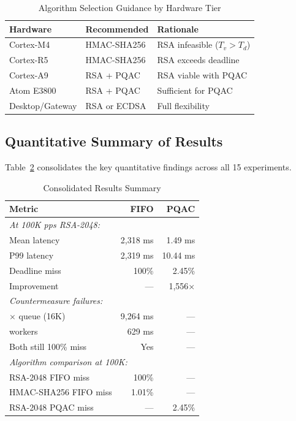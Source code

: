 \documentclass{ieeeaccess}
\begin{document}
\begin{table}[t]
\caption{Algorithm Selection Guidance by Hardware Tier}
\label{tab:algo_guidance}
\centering
\small
\begin{tabular}{lll}
\toprule
\textbf{Hardware} & \textbf{Recommended} & \textbf{Rationale} \\
\midrule
Cortex-M4 & HMAC-SHA256 & RSA infeasible ($T_v > T_d$) \\
Cortex-R5 & HMAC-SHA256 & RSA exceeds deadline \\
Cortex-A9 & RSA + PQAC & RSA viable with PQAC \\
Atom E3800 & RSA + PQAC & Sufficient for PQAC \\
Desktop/Gateway & RSA or ECDSA & Full flexibility \\
\bottomrule
\end{tabular}
\end{table}

\subsection{Quantitative Summary of Results}
Table~\ref{tab:summary_results} consolidates the key quantitative findings across all 15 experiments.

\begin{table}[t]
\caption{Consolidated Results Summary}
\label{tab:summary_results}
\centering
\small
\begin{tabular}{lrr}
\toprule
\textbf{Metric} & \textbf{FIFO} & \textbf{PQAC} \\
\midrule
\multicolumn{3}{l}{\textit{At 100K pps RSA-2048:}} \\
\quad Mean latency & 2,318 ms & 1.49 ms \\
\quad P99 latency & 2,319 ms & 10.44 ms \\
\quad Deadline miss & 100\% & 2.45\% \\
\quad Improvement & --- & 1,556$\times$ \\
\midrule
\multicolumn{3}{l}{\textit{Countermeasure failures:}} \\
\quad 4$\times$ queue (16K) & 9,264 ms & --- \\
\quad 4 workers & 629 ms & --- \\
\quad Both still 100\% miss & Yes & --- \\
\midrule
\multicolumn{3}{l}{\textit{Algorithm comparison at 100K:}} \\
\quad RSA-2048 FIFO miss & 100\% & --- \\
\quad HMAC-SHA256 FIFO miss & 1.01\% & --- \\
\quad RSA-2048 PQAC miss & --- & 2.45\% \\
\bottomrule
\end{tabular}
\end{table}
\end{document}
